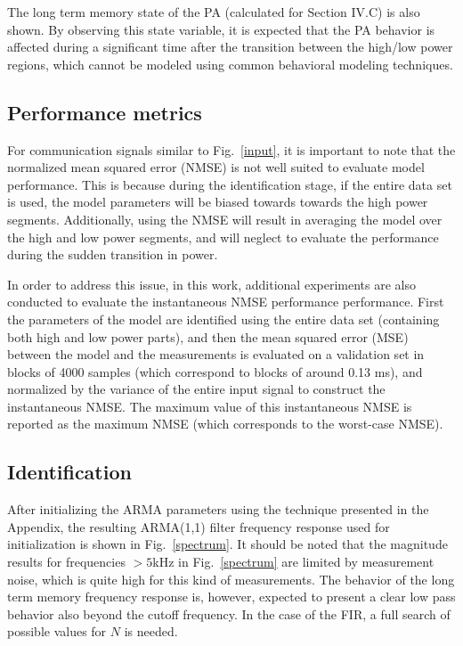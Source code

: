 \documentclass[journal]{IEEEtran}
\begin{document}
The long term memory state of the PA (calculated for Section IV.C) is also shown. By observing this state variable, it is expected that the PA behavior is affected during a significant time after the transition between the high/low power regions, which cannot be modeled using common behavioral modeling techniques.

\subsection{Performance metrics}
For communication signals similar to Fig.~\ref{input}, it is important to note that the normalized mean squared error (NMSE) is not well suited to evaluate model performance. This is because during the identification stage, if the entire data set is used, the model parameters will be biased towards towards the high power segments. Additionally, using the NMSE will result in averaging the model over the high and low power segments, and will neglect to evaluate the performance during the sudden transition in power.

In order to address this issue, in this work, additional experiments are also conducted to evaluate the instantaneous NMSE performance performance. First the parameters of the model are identified using the entire data set (containing both high and low power parts), and then the mean squared error (MSE) between the model and the measurements is evaluated on a validation set in blocks of 4000 samples (which correspond to blocks of around 0.13 ms), and normalized by the variance of the entire input signal to construct the instantaneous NMSE. The maximum value of this instantaneous NMSE is reported as the maximum NMSE (which corresponds to the worst-case NMSE).

\subsection{Identification}
After initializing the ARMA parameters using the technique presented in the Appendix, the resulting ARMA(1,1)
filter frequency response used for initialization is shown in Fig.~\ref{spectrum}. It should be noted that the 
magnitude results for frequencies $>5$kHz in Fig.~\ref{spectrum} are limited by measurement noise, which is 
quite high for this kind of measurements. The behavior of the long term memory frequency response is, however, 
expected to present a clear low pass behavior also beyond the cutoff frequency. In the case of the FIR, a full
search of possible values for $N$ is needed.
\end{document}
